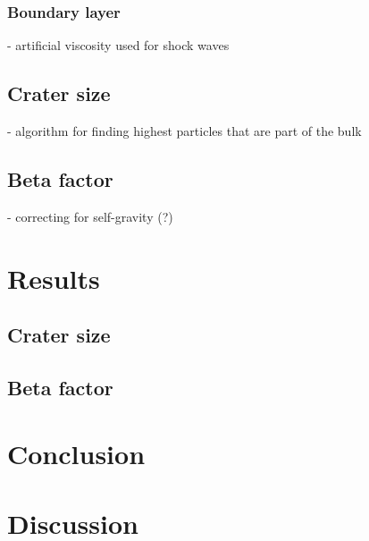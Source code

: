 \documentclass{article}
\begin{document}
			\subsubsection{Boundary layer}
			- artificial viscosity used for shock waves
		\subsection{Crater size}
		- algorithm for finding highest particles that are part of the bulk
		\subsection{Beta factor}
		- correcting for self-gravity (?)
	\section{Results}
		\subsection{Crater size}
		\subsection{Beta factor}
	\section{Conclusion}
	\section{Discussion}

	\newpage
	\printbibliography
\end{document}

